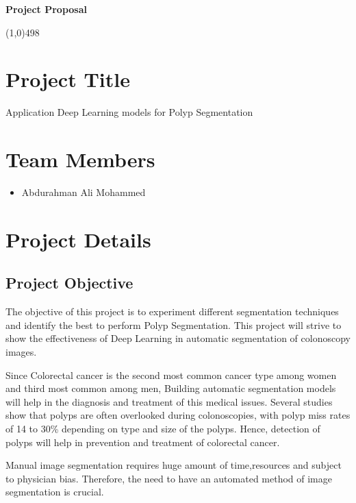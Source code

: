 \documentclass[11pt]{article}
\begin{document}
\begin{center}
{\Large \textbf{Project Proposal}}\\
\end{center}

\linethickness{1mm}\line(1,0){498}



\section{Project Title}

Application Deep Learning models for Polyp Segmentation

\section{Team Members}

\begin{itemize}
  \item Abdurahman Ali Mohammed
\end{itemize}

\section{Project Details}

\subsection{Project Objective}

The objective of this project is to experiment different segmentation techniques and identify the best to perform Polyp Segmentation. This project will strive to show the effectiveness of Deep Learning in automatic segmentation of colonoscopy images.

Since Colorectal cancer is the second most common cancer type among women and
third most common among men, Building automatic segmentation models will help in the diagnosis and treatment of this medical issues. Several studies show that polyps are often overlooked during colonoscopies, with polyp miss rates of 14 to 30\% depending on type and size of the polyps. Hence, detection of polyps will help in prevention and treatment of colorectal cancer.

Manual image segmentation requires huge amount of time,resources and subject to physician bias. Therefore, the need to have an automated method of image segmentation is crucial.
\end{document}
